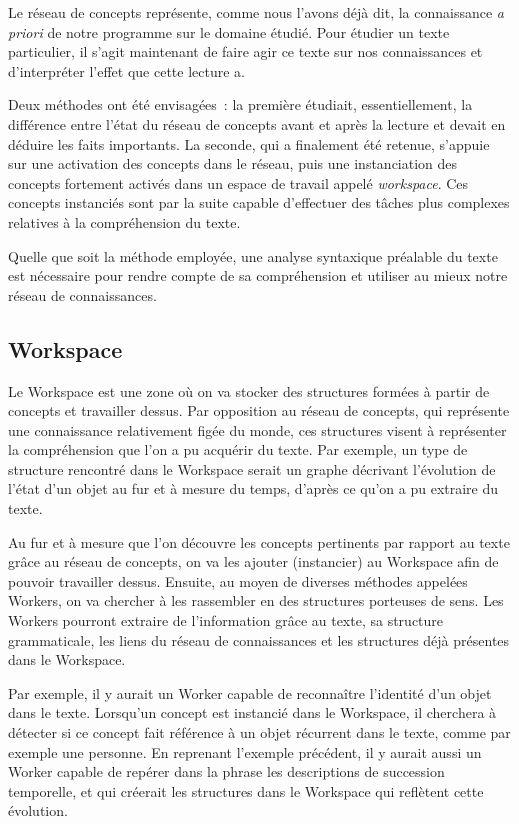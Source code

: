 \documentclass[a4paper, 12pt]{article}
\begin{document}
Le réseau de concepts représente, comme nous l'avons déjà dit, la connaissance \textit{a priori} de notre programme sur le domaine étudié. Pour étudier un texte particulier, il s'agit maintenant de faire agir ce texte sur nos connaissances et d'interpréter l'effet que cette lecture a.

Deux méthodes ont été envisagées~: la première étudiait, essentiellement, la différence entre l'état du réseau de concepts avant et après la lecture et devait en déduire les faits importants. La seconde, qui a finalement été retenue, s'appuie sur une activation des concepts dans le réseau, puis une instanciation des concepts fortement activés dans un espace de travail appelé \textit{workspace}. Ces concepts instanciés sont par la suite capable d'effectuer des tâches plus complexes relatives à la compréhension du texte.

Quelle que soit la méthode employée, une analyse syntaxique préalable du texte est nécessaire pour rendre compte de sa compréhension et utiliser au mieux notre réseau de connaissances.

\subsection{Workspace}
Le Workspace est une zone où on va stocker des structures formées à partir de concepts et travailler dessus. Par opposition au réseau de concepts, qui représente une connaissance relativement figée du monde, ces structures visent à représenter la compréhension que l'on a pu acquérir du texte.
Par exemple, un type de structure rencontré dans le Workspace serait un graphe décrivant l'évolution de l'état d'un objet au fur et à mesure du temps, d'après ce qu'on a pu extraire du texte.

Au fur et à mesure que l'on découvre les concepts pertinents par rapport au texte grâce au réseau de concepts, on va les ajouter (instancier) au Workspace afin de pouvoir travailler dessus. Ensuite, au moyen de diverses méthodes appelées Workers, on va chercher à les rassembler en des structures porteuses de sens. Les Workers pourront extraire de l'information grâce au texte, sa structure grammaticale, les liens du réseau de connaissances et les structures déjà présentes dans le Workspace.

Par exemple, il y aurait un Worker capable de reconnaître l'identité d'un objet dans le texte. Lorsqu'un concept est instancié dans le Workspace, il cherchera à détecter si ce concept fait référence à un objet récurrent dans le texte, comme par exemple une personne.
En reprenant l'exemple précédent, il y aurait aussi un Worker capable de repérer dans la phrase les descriptions de succession temporelle, et qui créerait les structures dans le Workspace qui reflètent cette évolution. 
\end{document}

